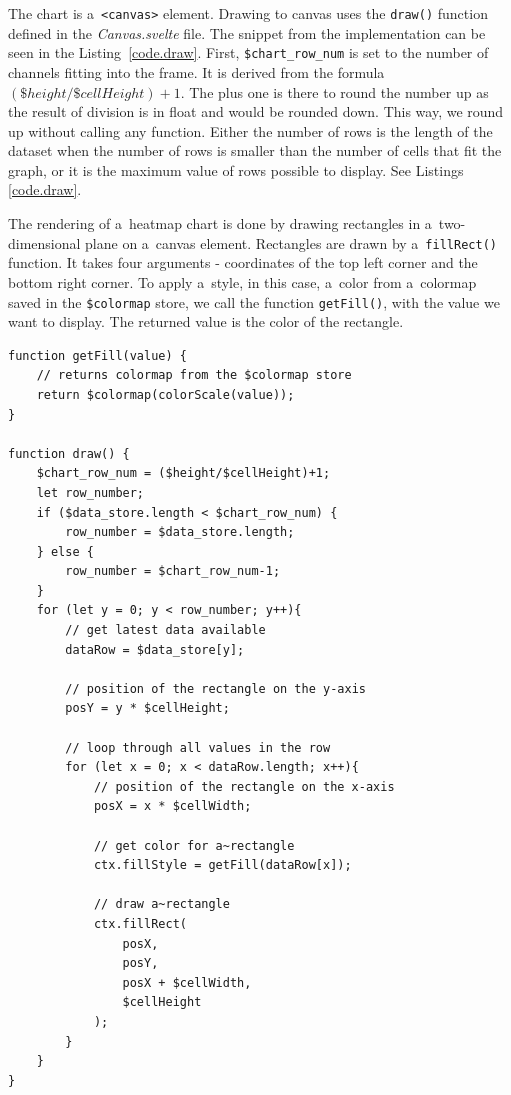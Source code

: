 The chart is a~\verb|<canvas>| element. Drawing to canvas uses the \verb|draw()| function defined in the \textit{Canvas.svelte} file. The snippet from the implementation can be seen in the Listing~\ref{code.draw}. First, \verb|$chart_row_num| is set to the number of channels fitting into the frame. It is derived from the formula $(\$height/\$cellHeight)+1$. The plus one is there to round the number up as the result of division is in float and would be rounded down. This way, we round up without calling any function. Either the number of rows is the length of the dataset when the number of rows is smaller than the number of cells that fit the graph, or it is the maximum value of rows possible to display. See Listings \ref{code.draw}.

The rendering of a~heatmap chart is done by drawing rectangles in a~two-dimensional plane on a~canvas element. Rectangles are drawn by a~\texttt{fillRect()} function. It takes four arguments - coordinates of the top left corner and the bottom right corner. To apply a~style, in this case, a~color from a~colormap saved in the \texttt{\$colormap} store, we call the function \texttt{getFill()}, with the value we want to display. The returned value is the color of the rectangle. 


\newpage
\begin{lstlisting}[style=htmlcssjs,label=code.draw,caption={Implementation of drawing to canvas.}]
function getFill(value) {
    // returns colormap from the $colormap store
    return $colormap(colorScale(value));
}

function draw() {
    $chart_row_num = ($height/$cellHeight)+1;
    let row_number;
    if ($data_store.length < $chart_row_num) {
        row_number = $data_store.length;
    } else {
        row_number = $chart_row_num-1;
    }
    for (let y = 0; y < row_number; y++){
        // get latest data available
        dataRow = $data_store[y];
        
        // position of the rectangle on the y-axis
        posY = y * $cellHeight; 
    
        // loop through all values in the row
        for (let x = 0; x < dataRow.length; x++){ 
            // position of the rectangle on the x-axis
            posX = x * $cellWidth;

            // get color for a~rectangle
            ctx.fillStyle = getFill(dataRow[x]);

            // draw a~rectangle
            ctx.fillRect(
                posX,
                posY, 
                posX + $cellWidth,
                $cellHeight
            );
        }
    }
}
\end{lstlisting}

